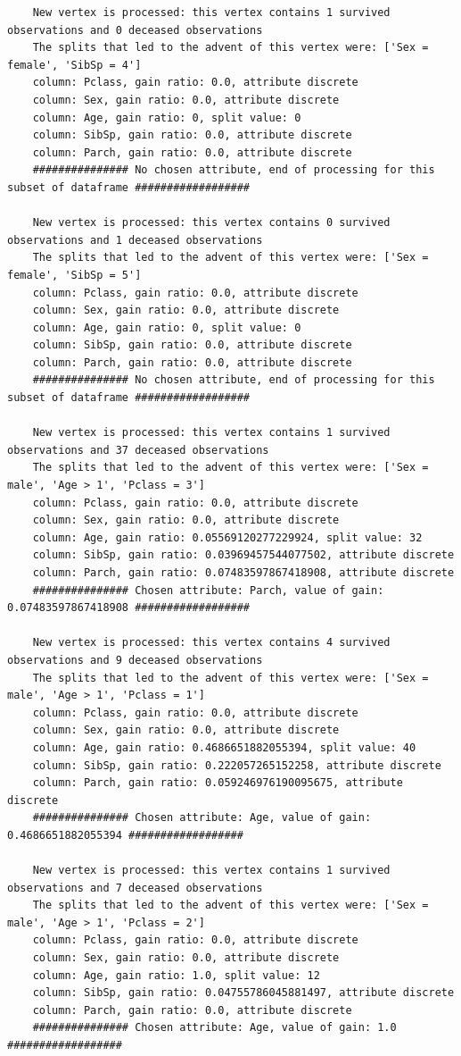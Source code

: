 \documentclass[12pt]{article}
\begin{document}
\begin{verbatim}
	New vertex is processed: this vertex contains 1 survived observations and 0 deceased observations
	The splits that led to the advent of this vertex were: ['Sex = female', 'SibSp = 4']
	column: Pclass, gain ratio: 0.0, attribute discrete
	column: Sex, gain ratio: 0.0, attribute discrete
	column: Age, gain ratio: 0, split value: 0
	column: SibSp, gain ratio: 0.0, attribute discrete
	column: Parch, gain ratio: 0.0, attribute discrete
	############### No chosen attribute, end of processing for this subset of dataframe ##################
	
	New vertex is processed: this vertex contains 0 survived observations and 1 deceased observations
	The splits that led to the advent of this vertex were: ['Sex = female', 'SibSp = 5']
	column: Pclass, gain ratio: 0.0, attribute discrete
	column: Sex, gain ratio: 0.0, attribute discrete
	column: Age, gain ratio: 0, split value: 0
	column: SibSp, gain ratio: 0.0, attribute discrete
	column: Parch, gain ratio: 0.0, attribute discrete
	############### No chosen attribute, end of processing for this subset of dataframe ##################
	
	New vertex is processed: this vertex contains 1 survived observations and 37 deceased observations
	The splits that led to the advent of this vertex were: ['Sex = male', 'Age > 1', 'Pclass = 3']
	column: Pclass, gain ratio: 0.0, attribute discrete
	column: Sex, gain ratio: 0.0, attribute discrete
	column: Age, gain ratio: 0.05569120277229924, split value: 32
	column: SibSp, gain ratio: 0.03969457544077502, attribute discrete
	column: Parch, gain ratio: 0.07483597867418908, attribute discrete
	############### Chosen attribute: Parch, value of gain: 0.07483597867418908 ##################
	
	New vertex is processed: this vertex contains 4 survived observations and 9 deceased observations
	The splits that led to the advent of this vertex were: ['Sex = male', 'Age > 1', 'Pclass = 1']
	column: Pclass, gain ratio: 0.0, attribute discrete
	column: Sex, gain ratio: 0.0, attribute discrete
	column: Age, gain ratio: 0.4686651882055394, split value: 40
	column: SibSp, gain ratio: 0.222057265152258, attribute discrete
	column: Parch, gain ratio: 0.059246976190095675, attribute discrete
	############### Chosen attribute: Age, value of gain: 0.4686651882055394 ##################
	
	New vertex is processed: this vertex contains 1 survived observations and 7 deceased observations
	The splits that led to the advent of this vertex were: ['Sex = male', 'Age > 1', 'Pclass = 2']
	column: Pclass, gain ratio: 0.0, attribute discrete
	column: Sex, gain ratio: 0.0, attribute discrete
	column: Age, gain ratio: 1.0, split value: 12
	column: SibSp, gain ratio: 0.04755786045881497, attribute discrete
	column: Parch, gain ratio: 0.0, attribute discrete
	############### Chosen attribute: Age, value of gain: 1.0 ##################
	

\end{verbatim}
\end{document}
